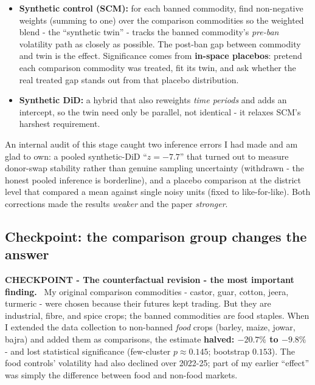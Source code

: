 \documentclass[11pt]{article}
\newenvironment{checkpoint}[1]
  {\begin{framed}\noindent\textbf{CHECKPOINT - #1.}\ }
  {\end{framed}}
\begin{document}
\begin{itemize}[leftmargin=1.8em,itemsep=1pt]
  \item \textbf{Synthetic control (SCM):} for each banned commodity, find non-negative
        weights (summing to one) over the comparison commodities so the weighted blend -
        the ``synthetic twin'' - tracks the banned commodity's \emph{pre-ban} volatility
        path as closely as possible. The post-ban gap between commodity and twin is the
        effect. Significance comes from \textbf{in-space placebos}: pretend each comparison
        commodity was treated, fit its twin, and ask whether the real treated gap stands
        out from that placebo distribution.
  \item \textbf{Synthetic DiD:} a hybrid that also reweights \emph{time periods} and adds
        an intercept, so the twin need only be parallel, not identical - it relaxes SCM's
        harshest requirement.
\end{itemize}

An internal audit of this stage caught two inference errors I had made and am glad to own:
a pooled synthetic-DiD ``$z=-7.7$'' that turned out to measure donor-swap stability rather
than genuine sampling uncertainty (withdrawn - the honest pooled inference is borderline),
and a placebo comparison at the district level that compared a mean against single noisy
units (fixed to like-for-like). Both corrections made the results \emph{weaker} and the
paper \emph{stronger}.

\subsection{Checkpoint: the comparison group changes the answer}

\begin{checkpoint}{The counterfactual revision - the most important finding}
My original comparison commodities - castor, guar, cotton, jeera, turmeric - were chosen
because their futures kept trading. But they are industrial, fibre, and spice crops; the
banned commodities are food staples. When I extended the data collection to non-banned
\emph{food} crops (barley, maize, jowar, bajra) and added them as comparisons, the
estimate \textbf{halved: $-20.7\%$ to $-9.8\%$} - and lost statistical significance
(few-cluster $p\approx0.145$; bootstrap $0.153$). The food controls' volatility had also
declined over 2022-25; part of my earlier ``effect'' was simply the difference between
food and non-food markets.
\end{checkpoint}
\end{document}
